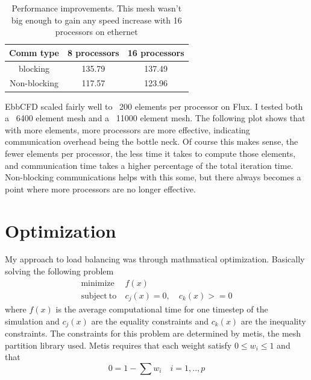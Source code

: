\documentclass[12pt,parskip=full]{article}
\numberwithin{subsection}{section}
\begin{document}
		\begin{table}
			\centering
			\begin{tabular}{ c | c | c}
				Comm type & 8 processors & 16 processors \\ \hline
				blocking & 135.79 & 137.49 \\
				Non-blocking & 117.57 & 123.96 \\ 
			\end{tabular}
			\caption{Performance improvements. This mesh wasn't big enough to gain any speed increase with 16 processors on ethernet}
		\end{table}

		EbbCFD scaled fairly well to ~200 elements per processor on Flux. I tested both a ~6400 element mesh and a ~11000 element mesh. The following
		plot shows that with more elements, more processors are more effective, indicating communication overhead being the
		bottle neck. Of course this makes sense, the fewer elements per processor, the less time it takes to compute those elements,
		and communication time takes a higher percentage of the total iteration time. Non-blocking communications helps with this
		some, but there always becomes a point where more processors are no longer effective. 
		
		\begin{figure}[H]
			\centering
			\begin{subfigure}[H]{0.3\textwidth}
			\end{subfigure}
			\begin{subfigure}[H]{0.3\textwidth}
			\end{subfigure}
		\end{figure}

	\section{Optimization}
		My approach to load balancing was through mathmatical optimization. Basically solving the following problem
		\begin{align}
			\mathrm{minimize \ }& f(x) \\
			\mathrm{subject \ to \ } & c_j(x) = 0, \quad c_k(x) >= 0
		\end{align}
		where $f(x)$ is the average computational time for one timestep of the simulation and $c_j(x)$ are the equality constraints and 
		$c_k(x)$ are the inequality constraints. The constraints for this problem are determined by metis, the mesh partition library used.
		Metis requires that each weight satisfy $0 \le w_i \le 1$ and that
		\begin{equation}
			0 = 1 - \sum{w_i} \quad i = 1,..,p
		\end{equation}
		
\end{document}
